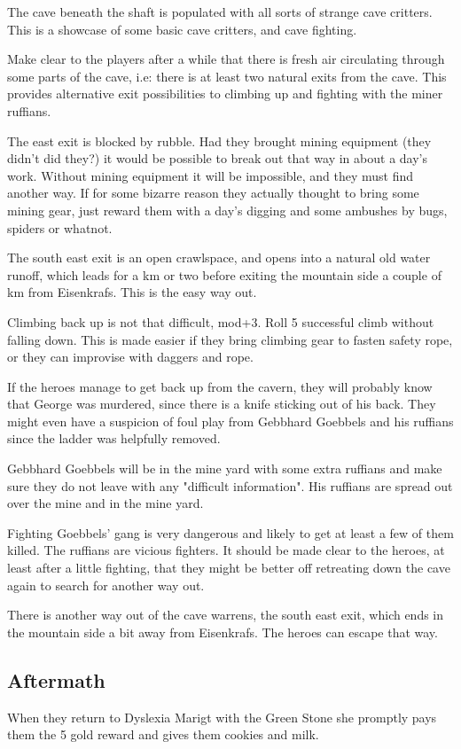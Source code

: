 \documentclass[11pt, twoside, titlepage, a4paper]{report}
\begin{document}
The cave beneath the shaft is populated with all sorts of strange cave critters.
This is a showcase of some basic cave critters, and cave fighting.

Make clear to the players after a while that there is fresh air circulating through some parts of the cave, i.e: there is at least two natural exits from the cave. This provides alternative exit possibilities to climbing up and fighting with the miner ruffians.

The east exit is blocked by rubble. Had they brought mining equipment (they didn't did they?) it would be possible to break out that way in about a day's work. Without mining equipment it will be impossible, and they must find another way. If for some bizarre reason they actually thought to bring some mining gear, just reward them with a day's digging and some ambushes by bugs, spiders or whatnot.

The south east exit is an open crawlspace, and opens into a natural old water runoff, which leads for a km or two before exiting the mountain side a couple of km from Eisenkrafs. This is the easy way out.

Climbing back up is not that difficult, mod+3. Roll 5 successful climb without falling down. This is made easier if they bring climbing gear to fasten safety rope, or they can improvise with daggers and rope.

If the heroes manage to get back up from the cavern, they will probably know that George was murdered, since there is a knife sticking out of his back. They might even have a suspicion of foul play from Gebbhard Goebbels and his ruffians since the ladder was helpfully removed.

Gebbhard Goebbels will be in the mine yard with some extra ruffians and make sure they do not leave with any "difficult information". His ruffians are spread out over the mine and in the mine yard.

Fighting Goebbels' gang is very dangerous and likely to get at least a few of them killed. The ruffians are vicious fighters. It should be made clear to the heroes, at least after a little fighting, that they might be better off retreating down the cave again to search for another way out.

There is another way out of the cave warrens, the south east exit, which ends in the mountain side a bit away from Eisenkrafs. The heroes can escape that way.


\subsection*{Aftermath}
When they return to Dyslexia Marigt with the Green Stone she promptly pays them the 5 gold reward and gives them cookies and milk.
\end{document}
